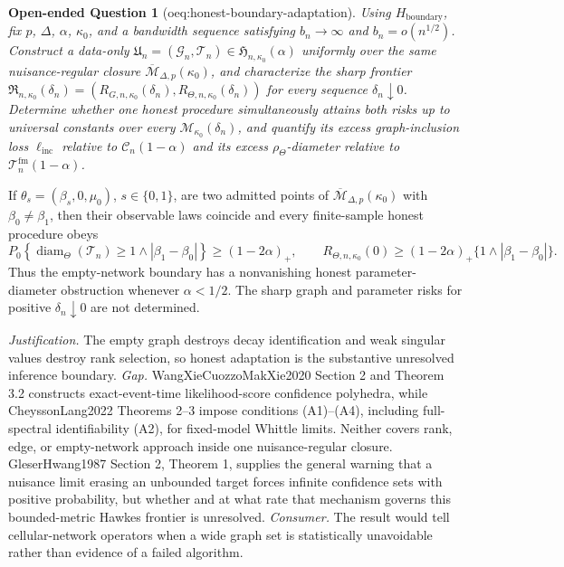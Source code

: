 \documentclass{article}
\newtheorem{openendedquestion}{Open-ended Question}
\begin{document}
\begin{openendedquestion}[oeq:honest-boundary-adaptation]\label{oeq:honest-boundary-adaptation}
Using \(H_{\mathrm{boundary}}\), fix \(p\), \(\Delta\), \(\alpha\), \(\kappa_0\), and a bandwidth sequence satisfying \(b_n\to\infty\) and \(b_n=o(n^{1/2})\). Construct a data-only \(\mathfrak U_n=(\mathcal G_n,\mathcal T_n)\in\mathfrak H_{n,\kappa_0}(\alpha)\) uniformly over the same nuisance-regular closure \(\overline{\mathcal M}_{\Delta,p}(\kappa_0)\), and characterize the sharp frontier \(\mathfrak R_{n,\kappa_0}(\delta_n)=(R_{G,n,\kappa_0}(\delta_n),R_{\Theta,n,\kappa_0}(\delta_n))\) for every sequence \(\delta_n\downarrow0\). Determine whether one honest procedure simultaneously attains both risks up to universal constants over every \(\mathcal M_{\kappa_0}(\delta_n)\), and quantify its excess graph-inclusion loss \(\ell_{\mathrm{inc}}\) relative to \(\mathcal C_n(1-\alpha)\) and its excess \(\rho_{\Theta}\)-diameter relative to \(\mathcal T_n^{\mathrm{fm}}(1-\alpha)\).
\end{openendedquestion}
If \(\theta_s=(\beta_s,0,\mu_0)\), \(s\in\{0,1\}\), are two admitted points of \(\overline{\mathcal M}_{\Delta,p}(\kappa_0)\) with \(\beta_0\neq\beta_1\), then their observable laws coincide and every finite-sample honest procedure obeys
\[
 P_0\!\left\{\operatorname{diam}_{\Theta}(\mathcal T_n)\geq1\wedge|\beta_1-\beta_0|\right\}\geq(1-2\alpha)_+,
 \qquad
 R_{\Theta,n,\kappa_0}(0)\geq(1-2\alpha)_+\{1\wedge|\beta_1-\beta_0|\}.
\]
Thus the empty-network boundary has a nonvanishing honest parameter-diameter obstruction whenever \(\alpha<1/2\). The sharp graph and parameter risks for positive \(\delta_n\downarrow0\) are not determined.
\par\smallskip\noindent \textit{Justification.} The empty graph destroys decay identification and weak singular values destroy rank selection, so honest adaptation is the substantive unresolved inference boundary. \textit{Gap.} WangXieCuozzoMakXie2020 Section 2 and Theorem 3.2 constructs exact-event-time likelihood-score confidence polyhedra, while CheyssonLang2022 Theorems 2--3 impose conditions (A1)--(A4), including full-spectral identifiability (A2), for fixed-model Whittle limits. Neither covers rank, edge, or empty-network approach inside one nuisance-regular closure. GleserHwang1987 Section 2, Theorem 1, supplies the general warning that a nuisance limit erasing an unbounded target forces infinite confidence sets with positive probability, but whether and at what rate that mechanism governs this bounded-metric Hawkes frontier is unresolved. \textit{Consumer.} The result would tell cellular-network operators when a wide graph set is statistically unavoidable rather than evidence of a failed algorithm.
\end{document}
